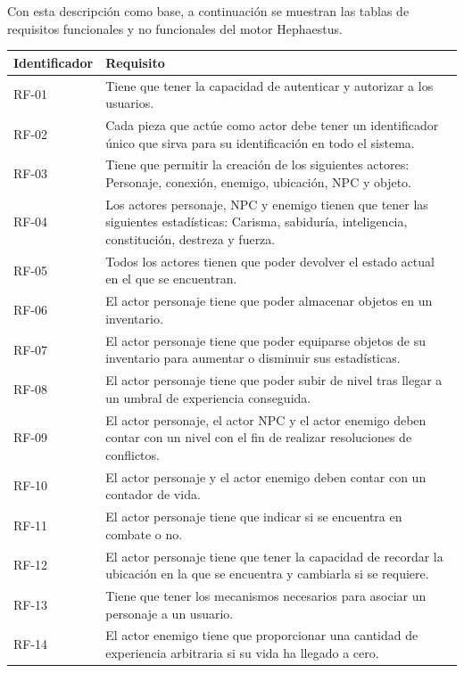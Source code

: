 Con esta descripción como base, a continuación se muestran las tablas de requisitos funcionales y no funcionales del motor Hephaestus.

{\footnotesize
\begin{tabularx}{\textwidth}{|l|X|}	
	\hline
	\rowcolor[HTML]{C0C0C0} 
	\textbf{Identificador} & \textbf{Requisito} \\ \hline
	RF-01 & Tiene que tener la capacidad de autenticar y autorizar a los usuarios. \\ \hline
	RF-02 & Cada pieza que actúe como actor debe tener un identificador único que sirva para su identificación en todo el sistema. \\ \hline
	RF-03 & Tiene que permitir la creación de los siguientes actores: Personaje, conexión, enemigo, ubicación, NPC y objeto. \\ \hline
	RF-04 & Los actores personaje, NPC y enemigo tienen que tener las siguientes estadísticas: Carisma, sabiduría, inteligencia, constitución, destreza y fuerza. \\ \hline
	RF-05 & Todos los actores tienen que poder devolver el estado actual en el que se encuentran. \\ \hline
	RF-06 & El actor personaje tiene que poder almacenar objetos en un inventario. \\ \hline
	RF-07 & El actor personaje tiene que poder equiparse objetos de su inventario para aumentar o disminuir sus estadísticas. \\ \hline
	RF-08 & El actor personaje tiene que poder subir de nivel tras llegar a un umbral de experiencia conseguida. \\ \hline
	RF-09 & El actor personaje, el actor NPC y el actor enemigo deben contar con un nivel con el fin de realizar resoluciones de conflictos. \\ \hline 
	RF-10 & El actor personaje y el actor enemigo deben contar con un contador de vida. \\ \hline
	RF-11 & El actor personaje tiene que indicar si se encuentra en combate o no. \\ \hline
	RF-12 & El actor personaje tiene que tener la capacidad de recordar la ubicación en la que se encuentra y cambiarla si se requiere. \\ \hline
	RF-13 & Tiene que tener los mecanismos necesarios para asociar un personaje a un usuario. \\ \hline
	RF-14 & El actor enemigo tiene que proporcionar una cantidad de experiencia arbitraria si su vida ha llegado a cero. \\ \hline

\end{tabularx}}
